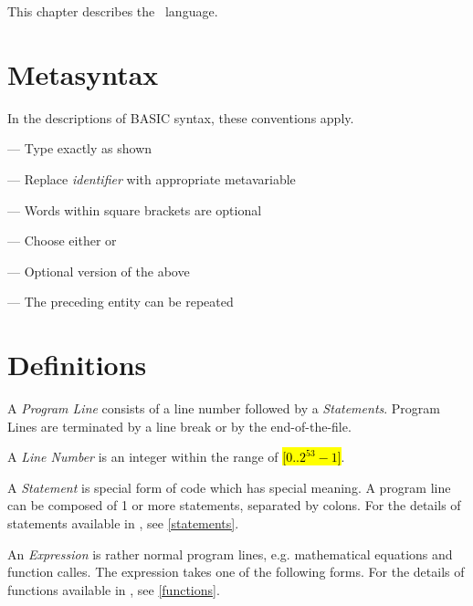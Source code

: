 \newcommand{\intrange}{\hl{[$0..2^{53}-1$]}}

This chapter describes the \tbas\ language.

\section{Metasyntax}

In the descriptions of BASIC syntax, these conventions apply.

\begin{itemlist}
\item {} --- Type exactly as shown
\item {} --- Replace \emph{identifier} with appropriate metavariable
\item \code{[a]} --- Words within square brackets are optional
\item {} --- Choose either  or 
\item \code{[a|b]} --- Optional version of the above
\item {} --- The preceding entity can be repeated
\end{itemlist}

\section{Definitions}

A \emph{Program Line} consists of a line number followed by a \emph{Statements}. Program Lines are terminated by a line break or by the end-of-the-file.

A \emph{Line Number} is an integer within the range of \intrange.

A \emph{Statement} is special form of code which has special meaning. A program line can be composed of 1 or more statements, separated by colons. For the details of statements available in \tbas , see \ref{statements}.


An \emph{Expression} is rather normal program lines, e.g. mathematical equations and function calles. The expression takes one of the following forms. For the details of functions available in \tbas , see \ref{functions}.

\\
\\
\\
\\
\\
\\

